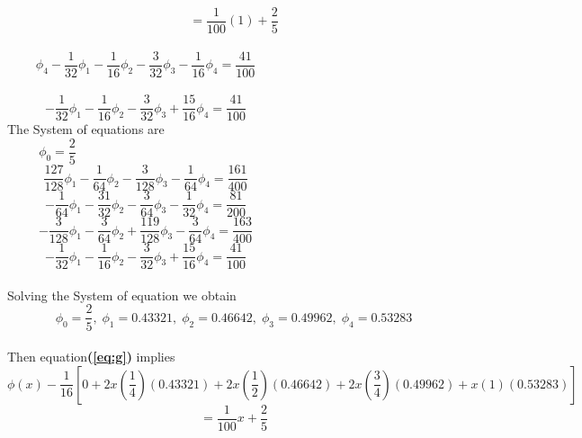 \documentclass[a4paper,12pt]{report}
\newcommand{\spn}[1]{\\[#1cm]}
\newcommand{\refn}[1]{\textbf{(\ref{#1})}}
\begin{document}
	$$
		= \frac{1}{100}\left(1\right)+\frac{2}{5}
	$$\spn{-0.5}
	$$
		\phi_4 - \frac{1}{32}\phi_1 -\frac{1}{16}\phi_2 -\frac{3}{32}\phi_3 -\frac{1}{16}\phi_4 = \frac{41}{100}\quad\quad\quad\quad\quad\quad\quad\quad\quad\quad\quad\quad\quad\quad
	$$\spn{-.8}
	\begin{equation}
		-\frac{1}{32}\phi_1 -\frac{1}{16}\phi_2 -\frac{3}{32}\phi_3 +\frac{15}{16}\phi_4 = \frac{41}{100} \tag{v} \quad\quad\quad\quad\quad\quad\quad\quad\quad\quad\quad\quad\quad\quad
	\end{equation}
	\newpage
	The System of equations are\spn{-.8}
	\begin{equation}
		\phi_0  = \frac{2}{5} \tag{i} \quad\quad\quad\quad\quad\quad\quad\quad\quad\quad\quad\quad\quad\quad\quad\quad\quad\quad\quad\quad\quad\quad\quad\quad\quad\quad\quad\quad
	\end{equation}
	\begin{equation}
		\frac{127}{128}\phi_1 -\frac{1}{64}\phi_2 -\frac{3}{128}\phi_3 -\frac{1}{64}\phi_4 = \frac{161}{400} \tag{ii} \quad\quad\quad\quad\quad\quad\quad\quad\quad\quad\quad\quad\quad\quad
	\end{equation}
	\begin{equation}
		-\frac{1}{64}\phi_1 -\frac{31}{32}\phi_2 -\frac{3}{64}\phi_3 -\frac{1}{32}\phi_4 = \frac{81}{200} \tag{iii} \quad\quad\quad\quad\quad\quad\quad\quad\quad\quad\quad\quad\quad\quad
	\end{equation}
	\begin{equation}
		-\frac{3}{128}\phi_1 -\frac{3}{64}\phi_2 +\frac{119}{128}\phi_3 -\frac{3}{64}\phi_4 = \frac{163}{400} \tag{iv} \quad\quad\quad\quad\quad\quad\quad\quad\quad\quad\quad\quad\quad\quad
	\end{equation}
	\begin{equation}
		-\frac{1}{32}\phi_1 -\frac{1}{16}\phi_2 -\frac{3}{32}\phi_3 +\frac{15}{16}\phi_4 = \frac{41}{100} \tag{v} \quad\quad\quad\quad\quad\quad\quad\quad\quad\quad\quad\quad\quad\quad
	\end{equation}
	\\Solving the System of equation we obtain\spn{-.7}
	$$
		\phi_0 = \frac{2}{5},\; \phi_1 = 0.43321, \; \phi_2 = 0.46642, \; \phi_3 = 0.49962, \; \phi_4 = 0.53283
	$$
	\spn{-.7}Then equation\refn{eq:g} implies\\
	$$
		\phi(x) - \frac{1}{16}\left[0 + 2x\left(\frac{1}{4}\right)\left(0.43321\right) + 2x\left(\frac{1}{2}\right)\left(0.46642\right)+2x\left(\frac{3}{4}\right)\left(0.49962\right) + x(1)(0.53283)\right]
	$$
	$$
		= \frac{1}{100}x +\frac{2}{5}
	$$\spn{-0.5}
\end{document}
